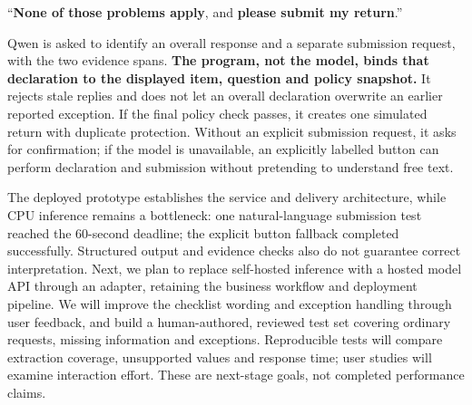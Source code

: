 \documentclass[10pt,letterpaper]{article}
\newcommand{\heading}[1]{\vspace{3pt}{\large\bfseries #1}\par\vspace{2pt}}
\newcommand{\code}[1]{\texttt{\small\detokenize{#1}}}
\newcommand{\semanticspan}[1]{\textcolor{semantic}{\textbf{#1}}}
\newcommand{\action}[1]{\textcolor{live}{\textbf{#1}}}
\newcommand{\fixedrule}[1]{\textcolor{rule}{\textbf{#1}}}
\newcommand{\examplequote}[1]{\begingroup\setlength{\fboxsep}{8pt}
\colorbox{bluewash}{\parbox{\dimexpr\linewidth-16pt\relax}{\large\raggedright
\textquotedblleft{}#1\textquotedblright{}}}\endgroup\par}
\begin{document}
\heading{Example 3: understand a declaration, then check permission}
\examplequote{\semanticspan{None of those problems apply}, and
\action{please submit my return}.}
Qwen is asked to identify an overall \code{all_clear} response and a separate
submission request, with the two evidence spans. \fixedrule{The program, not the model,
binds that declaration to the displayed item, question and policy snapshot.}
It rejects stale replies and does not let an overall declaration overwrite an
earlier reported exception. If the final policy check passes, it creates one
simulated return with duplicate protection. Without an explicit submission request,
it asks for confirmation; if the model is unavailable, an explicitly labelled button
can perform declaration and submission without pretending to understand free text.

\heading{Next steps: faster responses, smoother interaction and stronger evaluation}
The deployed prototype establishes the service and delivery architecture, while
CPU inference remains a bottleneck: one natural-language submission test reached
the 60-second deadline; the explicit button fallback completed successfully.
Structured output and evidence checks also do not guarantee correct interpretation.
Next, we plan to replace self-hosted inference with a hosted model API through an
adapter, retaining the business workflow and deployment pipeline. We will improve
the checklist wording and exception handling through user feedback, and build a
human-authored, reviewed test set covering ordinary requests, missing information
and exceptions. Reproducible tests will compare extraction coverage, unsupported
values and response time; user studies will examine interaction effort.
These are next-stage goals, not completed performance claims.
\label{report-end}
\end{document}
